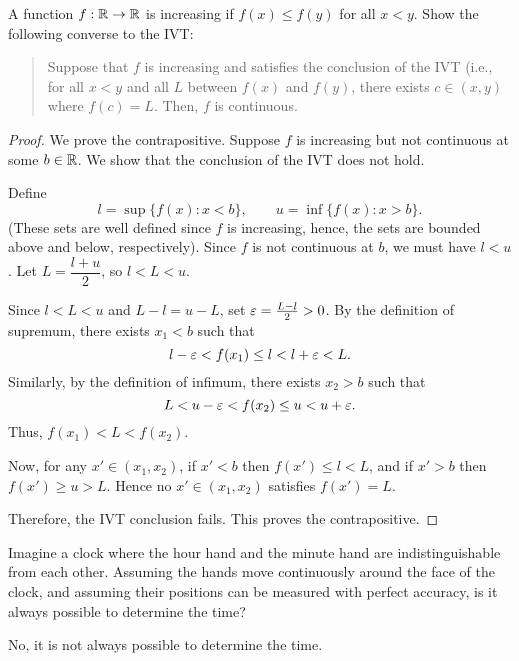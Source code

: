 \begin{problem}
  A function $f : \mathbb{R} \to \mathbb{R}$ is increasing if $f(x) \leq f(y)$ for all $x < y$. Show the following converse to the IVT:

  \begin{quote}
    Suppose that $f$ is increasing and satisfies the conclusion of the IVT
    (i.e., for all $x < y$ and all $L$ between $f(x)$ and $f(y)$, there exists
    $c \in (x, y)$ where $f(c) = L$. Then, $f$ is continuous.
  \end{quote}

  \begin{proof}
    We prove the contrapositive. Suppose $f$ is increasing but not continuous
    at some $b \in \mathbb{R}$. We show that the conclusion of the IVT does not hold.

    Define
    \[
      l = \sup \{ f(x) : x < b \}, \qquad u = \inf \{ f(x) : x > b \}.
    \]
    (These sets are well defined since $f$ is increasing, hence, the sets are
    bounded above and below, respectively).
    Since $f$ is not continuous at $b$, we must have $l<u$.
    Let $L = \dfrac{l+u}{2}$, so $l < L < u$.

    Since $l < L < u$ and $L - l = u - L$, set $\varepsilon = \frac{L - l}{2} > 0$.
    By the definition of supremum, there exists $x_{1} < b$ such that
    \[
      l - \varepsilon < f(x_{1}) \le l < l + \varepsilon < L.
    \]
    Similarly, by the definition of infimum, there exists $x_{2} > b$ such that
    \[
      L < u - \varepsilon < f(x_{2}) \le u < u + \varepsilon.
    \]
    Thus, $f(x_{1}) < L < f(x_{2})$.

    Now, for any $x'\in(x_{1},x_{2})$, if $x' < b$ then $f(x') \leq l < L$, and if
    $x' > b$ then $f(x') \geq u>L$. Hence no $x' \in (x_{1}, x_{2})$ satisfies
    $f(x') = L$.

    Therefore, the IVT conclusion fails. This proves the contrapositive.
  \end{proof}

\end{problem}

\begin{problem}
  Imagine a clock where the hour hand and the minute hand are indistinguishable
  from each other. Assuming the hands move continuously around the face of the
  clock, and assuming their positions can be measured with perfect accuracy, is
  it always possible to determine the time?

  \vspace{\baselineskip}

  No, it is not always possible to determine the time.
\end{problem}
